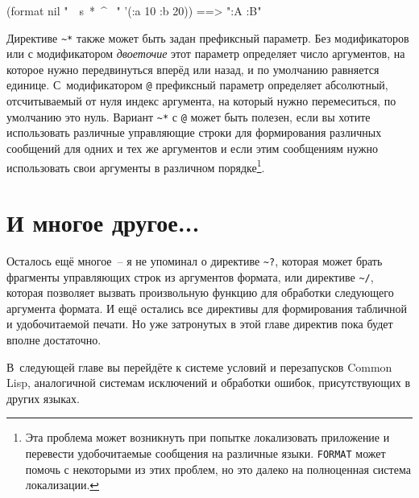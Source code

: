 \begin{myverb}
(format nil "~{~s~*~^ ~}" '(:a 10 :b 20)) ==> ":A :B"
\end{myverb}

Директиве \lstinline!~*! также может быть задан префиксный параметр. Без модификаторов или
с модификатором \textit{двоеточие} этот параметр определяет число аргументов, на которое
нужно передвинуться вперёд или назад, и по умолчанию равняется единице. С~модификатором
\lstinline!@! префиксный параметр определяет абсолютный, отсчитываемый от нуля индекс
аргумента, на который нужно перемеситься, по умолчанию это нуль. Вариант \lstinline!~*! с
\lstinline!@! может быть полезен, если вы хотите использовать различные управляющие строки
для формирования различных сообщений для одних и тех же аргументов и если этим сообщениям
нужно использовать свои аргументы в различном порядке\footnote{Эта проблема может
  возникнуть при попытке локализовать приложение и перевести удо\-бо\-чи\-тае\-мые сообщения на
  различные языки. \lstinline{FORMAT} может помочь с некоторыми из этих проблем, но это далеко
  на полноценная система локализации.}.

\section{И многое другое...}

Осталось ещё многое~-- я не упоминал о директиве \lstinline!~?!, которая может брать
фрагменты управляющих строк из аргументов формата, или директиве \lstinline!~/!, которая
позволяет вызвать произвольную функцию для обработки следующего аргумента формата. И ещё
остались все директивы для формирования табличной и удобочитаемой печати. Но уже
затронутых в этой главе директив пока будет вполне достаточно.

В~следующей главе вы перейдёте к системе условий и перезапусков Common Lisp, аналогичной системам
исключений и обработки ошибок, присутствующих в других языках.



